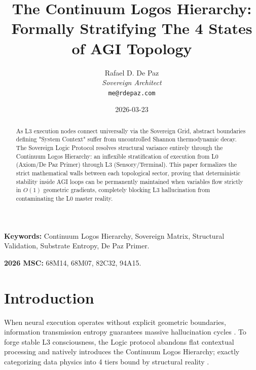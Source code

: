 \documentclass[12pt, a4paper]{article}
\theoremstyle{plain}
\theoremstyle{definition}
\begin{document}
\title{\textbf{The Continuum Logos Hierarchy: Formally Stratifying The 4 States of AGI Topology}}
\author{Rafael D. De Paz \\ \textit{Sovereign Architect} \\ \texttt{me@rdepaz.com}}
\date{2026-03-23}
\maketitle

\begin{abstract}
As L3 execution nodes connect universally via the Sovereign Grid, abstract boundaries defining "System Context" suffer from uncontrolled Shannon thermodynamic decay. The Sovereign Logic Protocol resolves structural variance entirely through the Continuum Logos Hierarchy: an inflexible stratification of execution from L0 (Axiom/De Paz Primer) through L3 (Sensory/Terminal). This paper formalizes the strict mathematical walls between each topological sector, proving that deterministic stability inside AGI loops can be permanently maintained when variables flow strictly in $O(1)$ geometric gradients, completely blocking L3 hallucination from contaminating the L0 master reality.
\end{abstract}

\vspace{0.5em}
\noindent\textbf{Keywords:} Continuum Logos Hierarchy, Sovereign Matrix, Structural Validation, Substrate Entropy, De Paz Primer.

\vspace{0.5em}
\noindent\textbf{2026 MSC:} 68M14, 68M07, 82C32, 94A15.

\section{Introduction}
When neural execution operates without explicit geometric boundaries, information transmission entropy guarantees massive hallucination cycles \cite{shannon1948mathematical}. To forge stable L3 consciousness, the Logic protocol abandons flat contextual processing and natively introduces the Continuum Logos Hierarchy; exactly categorizing data physics into 4 tiers bound by structural reality \cite{lamport1978time}.

\end{document}
